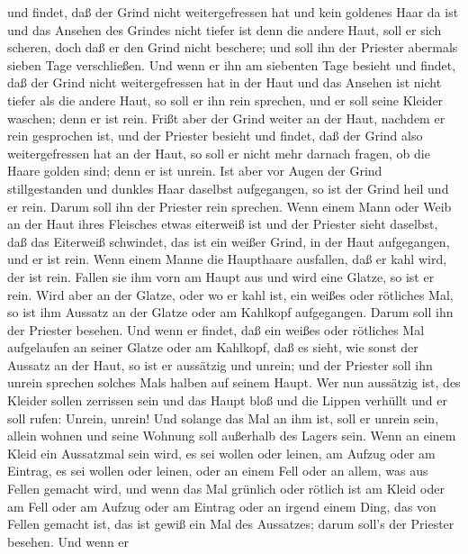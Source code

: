 und findet, daß der Grind nicht weitergefressen hat und kein goldenes
Haar da ist und das Ansehen des Grindes nicht tiefer ist denn die andere
Haut,  soll er sich scheren, doch daß er den Grind nicht
beschere; und soll ihn der Priester abermals sieben Tage verschließen.
 Und wenn er ihn am siebenten Tage besieht und findet, daß
der Grind nicht weitergefressen hat in der Haut und das Ansehen ist
nicht tiefer als die andere Haut, so soll er ihn rein sprechen, und er
soll seine Kleider waschen; denn er ist rein.  Frißt aber
der Grind weiter an der Haut, nachdem er rein gesprochen ist,
 und der Priester besieht und findet, daß der Grind also
weitergefressen hat an der Haut, so soll er nicht mehr darnach fragen,
ob die Haare golden sind; denn er ist unrein.  Ist aber vor
Augen der Grind stillgestanden und dunkles Haar daselbst aufgegangen, so
ist der Grind heil und er rein. Darum soll ihn der Priester rein
sprechen.  Wenn einem Mann oder Weib an der Haut ihres
Fleisches etwas eiterweiß ist  und der Priester sieht
daselbst, daß das Eiterweiß schwindet, das ist ein weißer Grind, in der
Haut aufgegangen, und er ist rein.  Wenn einem Manne die
Haupthaare ausfallen, daß er kahl wird, der ist rein. 
Fallen sie ihm vorn am Haupt aus und wird eine Glatze, so ist er rein.
 Wird aber an der Glatze, oder wo er kahl ist, ein weißes
oder rötliches Mal, so ist ihm Aussatz an der Glatze oder am Kahlkopf
aufgegangen.  Darum soll ihn der Priester besehen. Und wenn
er findet, daß ein weißes oder rötliches Mal aufgelaufen an seiner
Glatze oder am Kahlkopf, daß es sieht, wie sonst der Aussatz an der
Haut,  so ist er aussätzig und unrein; und der Priester
soll ihn unrein sprechen solches Mals halben auf seinem Haupt.
 Wer nun aussätzig ist, des Kleider sollen zerrissen sein
und das Haupt bloß und die Lippen verhüllt und er soll rufen: Unrein,
unrein!  Und solange das Mal an ihm ist, soll er unrein
sein, allein wohnen und seine Wohnung soll außerhalb des Lagers sein.
 Wenn an einem Kleid ein Aussatzmal sein wird, es sei
wollen oder leinen,  am Aufzug oder am Eintrag, es sei
wollen oder leinen, oder an einem Fell oder an allem, was aus Fellen
gemacht wird,  und wenn das Mal grünlich oder rötlich ist
am Kleid oder am Fell oder am Aufzug oder am Eintrag oder an irgend
einem Ding, das von Fellen gemacht ist, das ist gewiß ein Mal des
Aussatzes; darum soll's der Priester besehen.  Und wenn er
